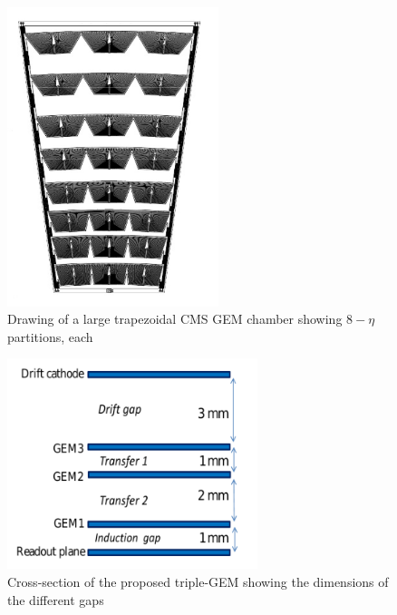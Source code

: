 \begin{figure}[!htbp]
	\begin{center}
		\includegraphics[width=0.55\textwidth]{figures/GEM/gemTrapezoidal.png}
		\caption{Drawing of a large trapezoidal CMS GEM chamber showing $8-\eta$ partitions, each}
		\label{fig:gemTrapezoidal}
	\end{center}
\end{figure} 
\begin{figure}[!htbp]
	\begin{center}
		\includegraphics[width=0.65\textwidth]{figures/GEM/tripple-gem.png}
		\caption{Cross-section of the proposed triple-GEM showing the dimensions of the different gaps}
		\label{fig:tripple-gem}
	\end{center}
\end{figure} 

